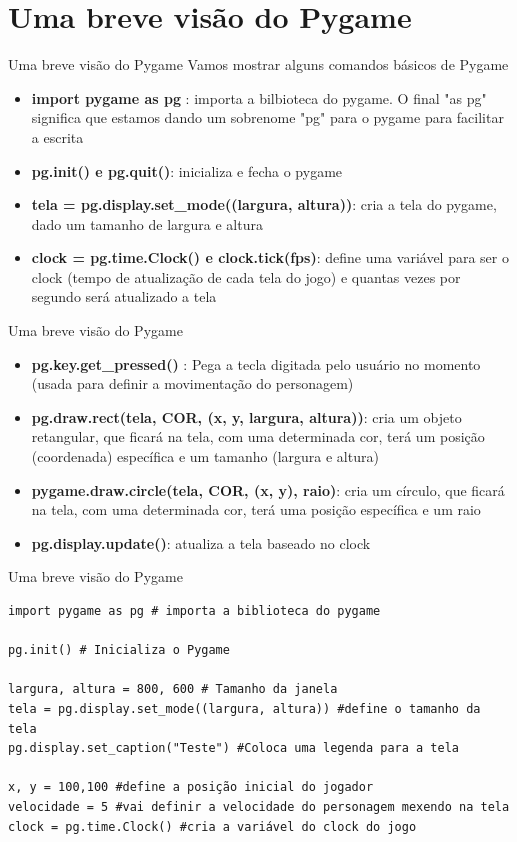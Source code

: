 \documentclass[fleqn,utf8,aspectratio=169,14pt]{beamer}
\begin{document}
	
	\section{Uma breve visão do Pygame}
	\begin{frame}{Uma breve visão do Pygame}
		Vamos mostrar alguns comandos básicos de Pygame
		\begin{itemize}
			\item \textbf{import pygame as pg} : importa a bilbioteca do pygame. O final "as pg" significa que estamos dando um sobrenome "pg" para o pygame para facilitar a escrita
			\item \textbf{pg.init() e pg.quit()}: inicializa e fecha o pygame
			\item \textbf{tela = pg.display.set\_mode((largura, altura))}: cria a tela do pygame, dado um tamanho de largura e altura
			\item \textbf{clock = pg.time.Clock() e clock.tick(fps)}: define uma variável para ser o clock (tempo de atualização de cada tela do jogo) e quantas vezes por segundo será atualizado a tela
		\end{itemize}
	
		
	\end{frame}
	\begin{frame}{Uma breve visão do Pygame}
		\begin{itemize}
			\item \textbf{pg.key.get\_pressed()} : Pega a tecla digitada pelo usuário no momento (usada para definir a movimentação do personagem)
			\item \textbf{pg.draw.rect(tela, COR, (x, y, largura, altura))}: cria um objeto retangular, que ficará na tela, com uma determinada cor, terá um posição (coordenada) específica e um tamanho (largura e altura)
			\item \textbf{pygame.draw.circle(tela, COR, (x, y), raio)}: cria um círculo, que ficará na tela, com uma determinada cor, terá uma posição específica e um raio
			\item \textbf{pg.display.update()}: atualiza a tela baseado no clock
		\end{itemize}
	\end{frame}
	
	
	\begin{frame}[fragile]{Uma breve visão do Pygame}
		\begin{lstlisting}
import pygame as pg # importa a biblioteca do pygame
		
pg.init() # Inicializa o Pygame
	
largura, altura = 800, 600 # Tamanho da janela
tela = pg.display.set_mode((largura, altura)) #define o tamanho da tela
pg.display.set_caption("Teste") #Coloca uma legenda para a tela
	
x, y = 100,100 #define a posição inicial do jogador		
velocidade = 5 #vai definir a velocidade do personagem mexendo na tela
clock = pg.time.Clock() #cria a variável do clock do jogo
		\end{lstlisting}
	\end{frame}
	
\end{document}
